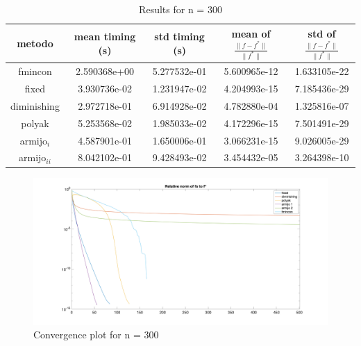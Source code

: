 
\begin{table}[H]
\setlength{\tabcolsep}{10pt} %
\renewcommand{\arraystretch}{1.2} %
\centering
\begin{tabular}{|ccccc|} 
\hline 
\multicolumn{1}{|c||}{metodo}   & \multicolumn{1}{c|}{mean timing (s)}    & \multicolumn{1}{c|}{std timing (s)} & \multicolumn{1}{c|}{mean of $\frac{\|f - f^*\|}{\|f^*\|}$}   & std of $\frac{\|f - f^*\|}{\|f^*\|}$ \\ \hline\hline 
\multicolumn{1}{|c||}{fmincon}       & \multicolumn{1}{c|}{2.590368e+00} & \multicolumn{1}{c|}{5.277532e-01}  & \multicolumn{1}{c|}{5.600965e-12} & 1.633105e-22  \\ \hline \hline
\multicolumn{1}{|c||}{fixed}       & \multicolumn{1}{c|}{3.930736e-02} & \multicolumn{1}{c|}{1.231947e-02}  & \multicolumn{1}{c|}{4.204993e-15} & 7.185436e-29  \\ \hline 
\multicolumn{1}{|c||}{diminishing}       & \multicolumn{1}{c|}{2.972718e-01} & \multicolumn{1}{c|}{6.914928e-02}  & \multicolumn{1}{c|}{4.782880e-04} & 1.325816e-07  \\ \hline 
\multicolumn{1}{|c||}{polyak}       & \multicolumn{1}{c|}{5.253568e-02} & \multicolumn{1}{c|}{1.985033e-02}  & \multicolumn{1}{c|}{4.172296e-15} & 7.501491e-29  \\ \hline 
\multicolumn{1}{|c||}{armijo$_{i}$}       & \multicolumn{1}{c|}{4.587901e-01} & \multicolumn{1}{c|}{1.650006e-01}  & \multicolumn{1}{c|}{3.066231e-15} & 9.026005e-29  \\ \hline 
\multicolumn{1}{|c||}{armijo$_{ii}$}       & \multicolumn{1}{c|}{8.042102e-01} & \multicolumn{1}{c|}{9.428493e-02}  & \multicolumn{1}{c|}{3.454432e-05} & 3.264398e-10  \\ \hline 
\end{tabular}

\caption{Results for n = 300}
\label{tab:300}
\end{table}


\begin{figure}[H]
\centering
    \includegraphics[width=20cm, center]{./plots/plot_300.png}
    \caption{Convergence plot for n = 300}
    \label{fig:300}
\end{figure} 